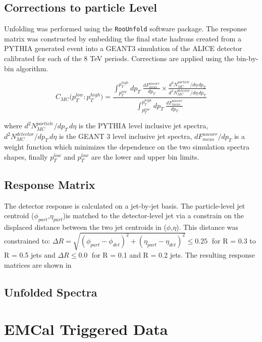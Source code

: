 \subsection{Corrections to particle Level}

Unfolding was performed using the \verb+RooUnfold+\cite{Adye:2011gm} software package.  The response matrix was constructed by embedding the final state hadrons created from a PYTHIA generated event into a GEANT3 simulation of the ALICE detector calibrated for each of the 8 TeV periods.  Corrections are applied using the bin-by-bin\cite{Cowan:2002in} algorithm. 

\begin{equation}
C_{MC} \big( p_{T}^{low} : p_{T}^{high} \big) =  \frac{  \int^{p_{T}^{high}}_{p_{T}^{low}} dp_{T} \; \frac{dF^{uncorr}_{meas}}{dp_{T}} \times \frac{d^{2}N^{particle}_{MC}/d\eta \, dp_{T}}{d^{2}N^{detector}_{MC}/d\eta \, dp_{T}}  } { \int^{p_{T}^{high}}_{p_{T}^{low}} dp_{T} \; \frac{dF^{uncorr}_{meas}}{dp_{T}} }
\label{eq:binbybin}
\end{equation}

\noindent
where $d^{2}N^{particle}_{MC}/dp_{T} \, d\eta$ is the PYTHIA level inclusive jet spectra, $d^{2}N^{detector}_{MC}/dp_{T} \, d\eta$ is the GEANT 3 level inclusive jet spectra, $dF^{uncorr}_{meas} / dp_{T}$ is a weight function which minimizes the dependence on the two simulation spectra shapes, finally $p_{T}^{low}$ and $p_{T}^{low}$ are the lower and upper bin limits.  

\subsection{Response Matrix}
The detector response is calculated on a jet-by-jet basis.  The particle-level jet centroid ($\phi_{part}$,$\eta_{part}$)is matched to the detector-level jet via a constrain on the displaced distance between the two jet centroids in ($\phi$,$\eta$).  This distance was constrained to: $\Delta  R = \sqrt{(\phi_{part} - \phi_{det})^{2} + (\eta_{part} - \eta_{det})^{2}} \leq 0.25 \; $ for R = 0.3 to R = 0.5 jets and $\Delta R \leq 0.0 \;$ for R = 0.1 and R = 0.2 jets.  The resulting response matrices are shown in


\subsection{Unfolded Spectra}

\section{EMCal Triggered Data}

